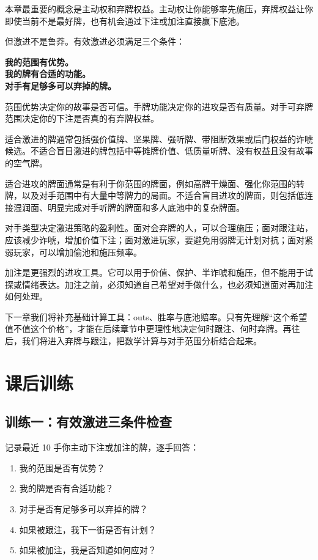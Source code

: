 本章最重要的概念是主动权和弃牌权益。主动权让你能够率先施压，弃牌权益让你即使当前不是最好牌，也有机会通过下注或加注直接赢下底池。

但激进不是鲁莽。有效激进必须满足三个条件：

\begin{center}
\textbf{我的范围有优势。\\
我的牌有合适的功能。\\
对手有足够多可以弃掉的牌。}
\end{center}

范围优势决定你的故事是否可信。手牌功能决定你的进攻是否有质量。对手可弃牌范围决定你的下注是否真的有弃牌权益。

适合激进的牌通常包括强价值牌、坚果牌、强听牌、带阻断效果或后门权益的诈唬候选。不适合盲目激进的牌包括中等摊牌价值、低质量听牌、没有权益且没有故事的空气牌。

适合进攻的牌面通常是有利于你范围的牌面，例如高牌干燥面、强化你范围的转牌，以及对手范围中有大量中等牌力的局面。不适合盲目进攻的牌面，则包括低连接湿润面、明显完成对手听牌的牌面和多人底池中的复杂牌面。

对手类型决定激进策略的盈利性。面对会弃牌的人，可以合理施压；面对跟注站，应该减少诈唬，增加价值下注；面对激进玩家，要避免用弱牌无计划对抗；面对紧弱玩家，可以增加偷池和施压频率。

加注是更强烈的进攻工具。它可以用于价值、保护、半诈唬和施压，但不能用于试探或情绪表达。加注之前，必须知道自己希望对手做什么，也必须知道面对再加注如何处理。

下一章我们将补充基础计算工具：outs、胜率与底池赔率。只有先理解“这个希望值不值这个价格”，才能在后续章节中更理性地决定何时跟注、何时弃牌。再往后，我们将进入弃牌与跟注，把数学计算与对手范围分析结合起来。

\section{课后训练}

\subsection*{训练一：有效激进三条件检查}

记录最近 10 手你主动下注或加注的牌，逐手回答：

\begin{enumerate}
\item 我的范围是否有优势？
\item 我的牌是否有合适功能？
\item 对手是否有足够多可以弃掉的牌？
\item 如果被跟注，我下一街是否有计划？
\item 如果被加注，我是否知道如何应对？
\end{enumerate}


